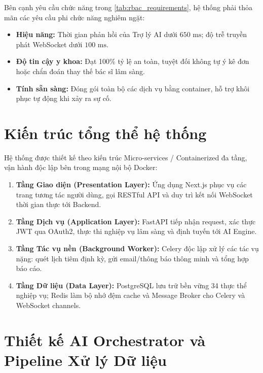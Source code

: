 Bên cạnh yêu cầu chức năng trong \cref{tab:rbac_requirements}, hệ thống phải thỏa mãn các yêu cầu phi chức năng nghiêm ngặt:
\begin{itemize}[leftmargin=1.5cm]
    \item \textbf{Hiệu năng:} Thời gian phản hồi của Trợ lý AI dưới $650\text{ ms}$; độ trễ truyền phát WebSocket dưới $100\text{ ms}$.
    \item \textbf{Độ tin cậy y khoa:} Đạt 100\% tỷ lệ an toàn, tuyệt đối không tự ý kê đơn hoặc chẩn đoán thay thế bác sĩ lâm sàng.
    \item \textbf{Tính sẵn sàng:} Đóng gói toàn bộ các dịch vụ bằng container, hỗ trợ khôi phục tự động khi xảy ra sự cố.
\end{itemize}

\section{Kiến trúc tổng thể hệ thống}
\label{sec:kientruc_hethong}

Hệ thống được thiết kế theo kiến trúc Micro-services / Containerized đa tầng, vận hành độc lập bên trong mạng nội bộ Docker:
\begin{enumerate}[label=\arabic*.]
    \item \textbf{Tầng Giao diện (Presentation Layer):} Ứng dụng Next.js phục vụ các trang tương tác người dùng, gọi RESTful API và duy trì kết nối WebSocket thời gian thực tới Backend.
    \item \textbf{Tầng Dịch vụ (Application Layer):} FastAPI tiếp nhận request, xác thực JWT qua OAuth2, thực thi nghiệp vụ lâm sàng và định tuyến tới AI Engine.
    \item \textbf{Tầng Tác vụ nền (Background Worker):} Celery độc lập xử lý các tác vụ nặng: quét lịch tiêm định kỳ, gửi email/thông báo thông minh và tổng hợp báo cáo.
    \item \textbf{Tầng Dữ liệu (Data Layer):} PostgreSQL lưu trữ bền vững 34 thực thể nghiệp vụ; Redis làm bộ nhớ đệm cache và Message Broker cho Celery và WebSocket channels.
\end{enumerate}


\section{Thiết kế AI Orchestrator và Pipeline Xử lý Dữ liệu}
\label{sec:thietke_pipeline}

